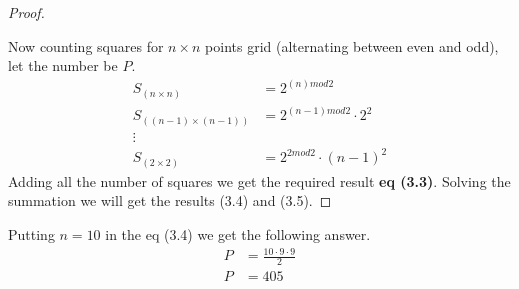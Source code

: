 \documentclass{article}
\let\bold\textbf
\newenvironment{myenv}{\begin{adjustwidth}{1cm}{}}{\end{adjustwidth}}
\begin{document}
{{\begin{proof}
\begin{myenv}
      \end{myenv}
      Now counting squares for $n \times n$ points grid (alternating between even and odd), let the number be $P$. \newline
      \begin{align*}
        S_{(n \times n)}&=2^{(n)mod2} \\
        S_{((n-1) \times (n-1))}&=2^{(n-1)mod2} \cdot 2^2 \\
        \vdots \\
        S_{(2 \times 2)}&=2^{2mod2} \cdot (n-1)^2
      \end{align*}
      Adding all the number of squares we get the required result \bold{eq (3.3)}. \newline
      Solving the summation we will get the results (3.4) and (3.5).
    \end{proof}
    Putting $n=10$ in the eq (3.4) we get the following answer.
    \begin{align*}
      P&=\frac{10 \cdot 9 \cdot 9}{2} \\
      P&=405
    \end{align*}
  }
}
\end{document}
